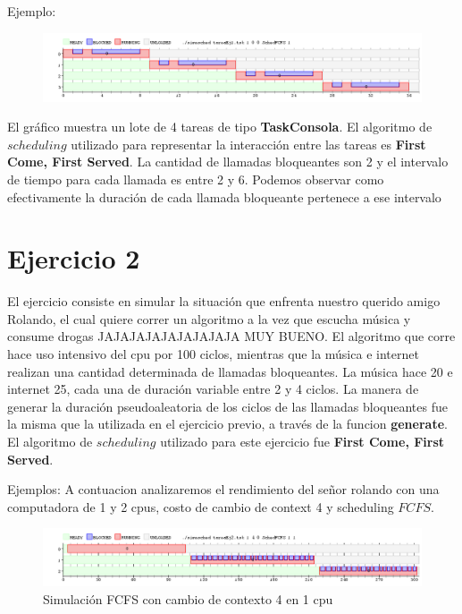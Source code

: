 \documentclass[11pt]{article}
\begin{document}
Ejemplo: 

      \begin{figure}[H]
        \includegraphics[scale=0.5]{ejercicio1}
      \end{figure}

El gráfico muestra un lote de 4 tareas de tipo \textbf{TaskConsola}. El algoritmo de $scheduling$ utilizado para representar la interacción 
entre las tareas es \textbf{First Come, First Served}. La cantidad de llamadas bloqueantes son 2 y el intervalo de 
tiempo para cada llamada es entre 2 y 6. Podemos observar como efectivamente la duración de cada llamada bloqueante pertenece a ese 
intervalo

\newpage

\section{Ejercicio 2}

El ejercicio consiste en simular la situación que enfrenta nuestro querido amigo Rolando, el cual quiere correr un algoritmo a la vez que escucha 
música y consume drogas JAJAJAJAJAJAJAJAJA MUY BUENO.  El algoritmo que corre hace uso intensivo del cpu por 100 ciclos, mientras que la música e internet realizan una 
cantidad determinada de llamadas bloqueantes. La música hace 20 e internet 25, cada una de duración variable entre 2 y 4 ciclos. La manera 
de generar la duración pseudoaleatoria de los ciclos de las llamadas bloqueantes fue la misma que la utilizada en el ejercicio previo, a través 
de la funcion \textbf{generate}. El algoritmo de $scheduling$ utilizado para este ejercicio fue \textbf{First Come, First Served}.

Ejemplos:
A contuacion analizaremos el rendimiento del señor rolando con una computadora de 1 y 2 cpus, costo de cambio de context 4 y scheduling $FCFS$.

  \begin{figure}[H]
    \includegraphics[scale=0.5]{Ejercicio2_1cpu}
    \caption{Simulación FCFS con cambio de contexto 4 en 1 cpu}
  \end{figure}
\end{document}
